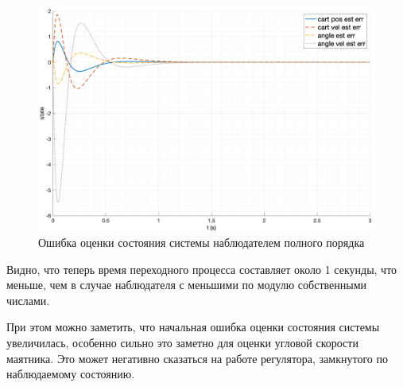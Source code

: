 \begin{figure}[ht!]
    \centering
    \includegraphics[width=\textwidth]{media/plots/modal_observer/observer_err_2.png}
    \caption{Ошибка оценки состояния системы наблюдателем полного порядка}
    \label{fig:observer_err_2}
\end{figure}
\FloatBarrier
Видно, что теперь время переходного процесса составляет около 1 секунды, что меньше, чем в случае 
наблюдателя с меньшими по модулю собственными числами. 

При этом можно заметить, что начальная ошибка оценки состояния системы увеличилась, особенно сильно это заметно
для оценки угловой скорости маятника. Это может негативно сказаться на работе регулятора, замкнутого по наблюдаемому состоянию.


